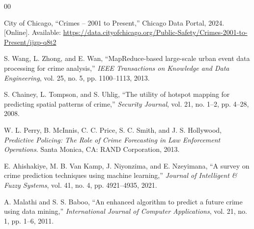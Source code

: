 \documentclass[conference]{IEEEtran}
\begin{document}
\begin{thebibliography}{00}

City of Chicago, ``Crimes -- 2001 to Present,'' Chicago Data Portal, 2024.
[Online]. Available: \url{https://data.cityofchicago.org/Public-Safety/Crimes-2001-to-Present/ijzp-q8t2}

S. Wang, L. Zhong, and E. Wan, ``MapReduce-based large-scale urban event data
processing for crime analysis,'' \textit{IEEE Transactions on Knowledge and Data
Engineering}, vol. 25, no. 5, pp. 1100--1113, 2013.

S. Chainey, L. Tompson, and S. Uhlig, ``The utility of hotspot mapping for
predicting spatial patterns of crime,'' \textit{Security Journal}, vol. 21,
no. 1--2, pp. 4--28, 2008.

W. L. Perry, B. McInnis, C. C. Price, S. C. Smith, and J. S. Hollywood,
\textit{Predictive Policing: The Role of Crime Forecasting in Law Enforcement
Operations}. Santa Monica, CA: RAND Corporation, 2013.

E. Ahishakiye, M. B. Van Kamp, J. Niyonzima, and E. Nzeyimana, ``A survey on
crime prediction techniques using machine learning,'' \textit{Journal of Intelligent
\& Fuzzy Systems}, vol. 41, no. 4, pp. 4921--4935, 2021.

A. Malathi and S. S. Baboo, ``An enhanced algorithm to predict a future crime
using data mining,'' \textit{International Journal of Computer Applications},
vol. 21, no. 1, pp. 1--6, 2011.

\end{thebibliography}
\end{document}
